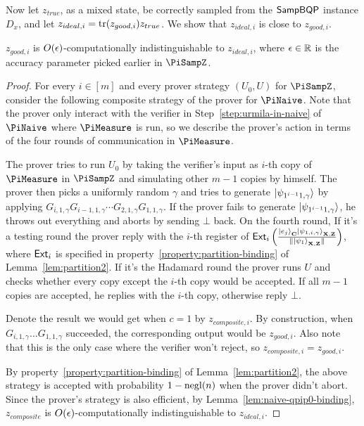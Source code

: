 Now let $z_{true}$, as a mixed state, be correctly sampled from the $\operatorname{\mathsf{SampBQP}}$ instance $D_x$,
and let $z_{ideal, i}=\operatorname{tr}(z_{good, i})z_{true}$.
We show that $z_{ideal, i}$ is close to $z_{good, i}$.
\begin{lemma}
	\label{thm:zgood-zideal}
	$z_{good, i}$ is $O(\epsilon)$-computationally indistinguishable to $z_{ideal, i}$,
	where $\epsilon\in\mathbb{R}$ is the accuracy parameter picked earlier in $\PiSampZ$.
\end{lemma}
\begin{proof}
	For every $i\in [m]$ and every prover strategy $(U_0,U)$ for $\PiSampZ$, consider the following composite strategy of the prover for $\PiNaive$. Note that the prover only interact with the verifier in Step~\ref{step:urmila-in-naive} of $\PiNaive$ where $\PiMeasure$ is run, so we describe the prover's action in terms of the four rounds of communication in $\PiMeasure$.

	The prover tries to run $U_0$ by taking the verifier's input as $i$-th copy of $\PiMeasure$ in $\PiSampZ$ and simulating other $m-1$ copies by himself. The prover then picks a uniformly random $\gamma$ and  tries to generate $\ket{\psi_{1^{i-1}1,\gamma}}$ by applying $G_{i,1,\gamma}G_{i-1,1,\gamma} \cdots G_{2,1,\gamma}G_{1,1,\gamma}$. If the prover fails to generate $\ket{\psi_{1^{i-1}1,\gamma}}$, he throws out everything and aborts by sending $\bot$ back.   On the fourth round,  If it's a testing round the prover reply with the $i$-th register of $\mathsf{Ext}_i\left(\frac{\ket{e_j}_{\mathbf{C}}\ket{\psi_{1,i,\gamma}}_{\mathbf{X},\mathbf{Z}}}{\|\ket{\psi_1}_{\mathbf{X},\mathbf{Z}}\|}\right)$, where $\mathsf{Ext}_i$ is specified in property~\ref{property:partition-binding} of Lemma~\ref{lem:partition2}. If it's the Hadamard round  the prover  runs $U$ and checks whether every copy except the $i$-th copy would be accepted. If all $m-1$ copies are accepted, he replies with the $i$-th copy, otherwise reply $\bot$.


	Denote the result we would get when $c=1$ by $z_{composite,i}$. By construction, when $G_{i,1,\gamma}\ldots G_{1,1,\gamma}$ succeeded, the corresponding output would be $z_{good,i}$. Also note that this is the only case where the verifier won't reject, so $z_{composite,i}=z_{good,i}$.

	By property~\ref{property:partition-binding} of Lemma~\ref{lem:partition2}, the above strategy is accepted with probability $1-\operatorname{negl}(n)$ when the prover didn't abort.
	Since the prover's strategy is also efficient, by Lemma~\ref{lem:naive-qpip0-binding},
	$z_{composite}$ is $O(\epsilon)$-computationally indistinguishable to $z_{ideal, i}$.
\end{proof}

